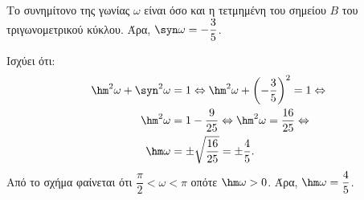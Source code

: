\begin{alist}
\item Το συνημίτονο της γωνίας $\omega$ είναι όσο και η τετμημένη του σημείου $B$ του τριγωνομετρικού κύκλου. Άρα, $\syn \omega = -\dfrac{3}{5}$.
\item Ισχύει ότι:
\begin{align*}
\hm ^2\omega + \syn ^2\omega &= 1 \Leftrightarrow \hm ^2\omega + \left(-\frac{3}{5}\right)^2 = 1 \Leftrightarrow \\
\hm ^2\omega &= 1 - \frac{9}{25} \Leftrightarrow \hm ^2\omega = \frac{16}{25} \Leftrightarrow \\
\hm \omega &= \pm\sqrt{\frac{16}{25}} = \pm\frac{4}{5}.
\end{align*}
Από το σχήμα φαίνεται ότι $\dfrac{\pi}{2} < \omega < \pi$ οπότε $\hm \omega > 0$. Άρα, $\hm \omega = \dfrac{4}{5}$.
\end{alist}


